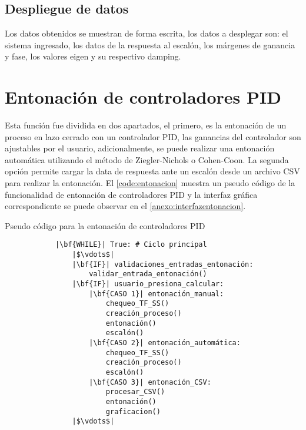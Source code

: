     \subsection{Despliegue de datos}
        
        Los datos obtenidos se muestran de forma escrita, los datos a desplegar son: el sistema ingresado, los datos de la respuesta al escalón, los márgenes de ganancia y fase, los valores eigen y su respectivo damping.

\section{Entonación de controladores PID}

    Esta función fue dividida en dos apartados, el primero, es la entonación de un proceso en lazo cerrado con un controlador PID, las ganancias del controlador son ajustables por el usuario, adicionalmente, se puede realizar una entonación automática utilizando el método de Ziegler-Nichols o Cohen-Coon. La segunda opción permite cargar la data de respuesta ante un escalón desde un archivo CSV para realizar la entonación. El \cref{code:entonacion} muestra un pseudo código de la funcionalidad de entonación de controladores PID y la interfaz gráfica correspondiente se puede observar en el \ref{anexo:interfazentonacion}.    
    
    \begin{longlisting}
        \caption[Pseudo código - Entonación de controladores PID]{Pseudo código para la entonación de controladores PID}
        \label{code:entonacion}				
        \begin{verbatim}
            |\bf{WHILE}| True: # Ciclo principal
                |$\vdots$|
                |\bf{IF}| validaciones_entradas_entonación:
                    validar_entrada_entonación()
                |\bf{IF}| usuario_presiona_calcular:
                    |\bf{CASO 1}| entonación_manual:
                        chequeo_TF_SS()
                        creación_proceso()
                        entonación()
                        escalón()
                    |\bf{CASO 2}| entonación_automática:
                        chequeo_TF_SS()
                        creación_proceso()
                        escalón()
                    |\bf{CASO 3}| entonación_CSV:
                        procesar_CSV()
                        entonación()
                        graficacion()
                |$\vdots$|
        \end{verbatim}
    \end{longlisting}

